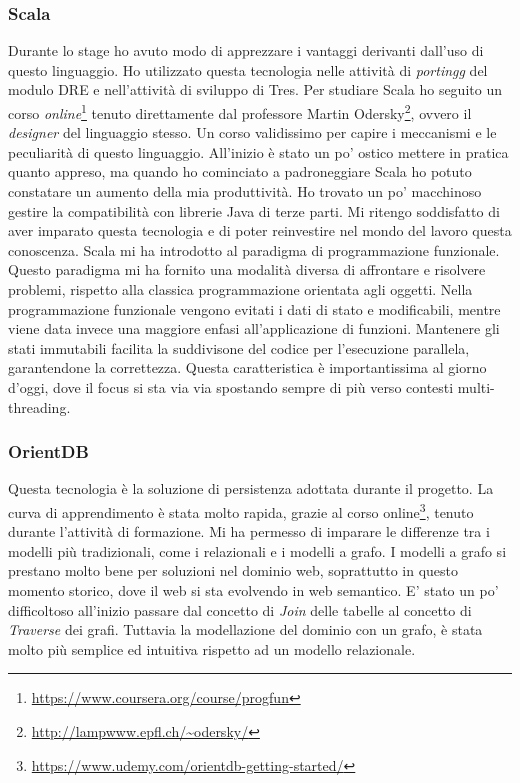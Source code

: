 \subsubsection{Scala}
Durante lo stage ho avuto modo di apprezzare i vantaggi derivanti dall'uso di questo linguaggio. Ho utilizzato questa tecnologia nelle attività di \emph{\gls{portingg}} del modulo DRE e nell'attività di sviluppo di Tres. Per studiare Scala ho seguito un corso \emph{online}\footnote{\url{https://www.coursera.org/course/progfun}} tenuto direttamente dal professore Martin Odersky\footnote{\url{http://lampwww.epfl.ch/~odersky/}}, ovvero il \emph{designer} del linguaggio stesso. Un corso validissimo per capire i meccanismi e le peculiarità di questo linguaggio. All'inizio è stato un po' ostico mettere in pratica quanto appreso, ma quando ho cominciato a padroneggiare Scala ho potuto constatare un aumento della mia produttività. Ho trovato un po' macchinoso gestire la compatibilità con librerie Java di terze parti. Mi ritengo soddisfatto di aver imparato questa tecnologia e di poter reinvestire nel mondo del lavoro questa conoscenza. 
Scala mi ha introdotto al paradigma di programmazione funzionale. Questo paradigma mi ha fornito una modalità diversa di affrontare e risolvere problemi, rispetto alla classica programmazione orientata agli oggetti. Nella programmazione funzionale vengono evitati i dati di stato e modificabili, mentre viene data invece una maggiore enfasi all'applicazione di funzioni. Mantenere gli stati immutabili facilita la suddivisone del codice per l'esecuzione parallela, garantendone la correttezza. Questa caratteristica è importantissima al giorno d'oggi, dove il focus si sta via via spostando sempre di più verso contesti multi-threading. %
\subsubsection{OrientDB}
Questa tecnologia è la soluzione di persistenza adottata durante il progetto. La curva di apprendimento è stata molto rapida, grazie al corso online\footnote{\url{https://www.udemy.com/orientdb-getting-started/}}, tenuto durante l'attività di formazione. Mi ha permesso di imparare le differenze tra i modelli più tradizionali, come i relazionali e i modelli a grafo. I modelli a grafo si prestano molto bene per soluzioni nel dominio web, soprattutto in questo momento storico, dove il web si sta evolvendo in web semantico. E' stato un po' difficoltoso all'inizio passare dal concetto di \emph{Join} delle tabelle al concetto di \emph{Traverse} dei grafi. Tuttavia la modellazione del dominio con un grafo, è stata molto più semplice ed intuitiva rispetto ad un modello relazionale. 
